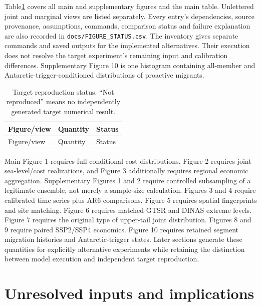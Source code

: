 \documentclass[11pt]{article}
\begin{document}
Table\ref{tab:status} covers all main and supplementary figures and the main
table. Unlettered joint and marginal views are listed separately. Every entry's
dependencies, source provenance, assumptions, commands, comparison status and
failure explanation are also recorded in \texttt{docs/FIGURE\_STATUS.csv}.
The inventory gives separate commands and saved outputs for the implemented
alternatives. Their execution does not resolve the target experiment's remaining
input and calibration differences. Supplementary Figure 10 is one histogram containing
all-member and Antarctic-trigger-conditioned distributions of proactive migrants.

\small
\begin{longtable}{p{}p{}p{}}
\caption{Target reproduction status. ``Not reproduced'' means no independently
generated target numerical result.}\label{tab:status}\\
\toprule Figure/view & Quantity & Status\\\midrule\endfirsthead
\toprule Figure/view & Quantity & Status\\\midrule\endhead

\bottomrule
\end{longtable}
\normalsize

Main Figure 1 requires full conditional cost distributions. Figure 2 requires
joint sea-level/cost realizations, and Figure 3 additionally requires regional
economic aggregation. Supplementary Figures 1 and 2 require controlled subsampling
of a legitimate ensemble, not merely a sample-size calculation. Figures 3 and 4
require calibrated time series plus AR6 comparisons. Figure 5 requires spatial
fingerprints and site matching. Figure 6 requires matched GTSR and DINAS extreme
levels. Figure 7 requires the original type of upper-tail joint distribution.
Figures 8 and 9 require paired SSP2/SSP4 economics. Figure 10 requires retained
segment migration histories and Antarctic-trigger states. Later sections
generate these quantities for explicitly alternative experiments while retaining
the distinction between model execution and independent target reproduction.









\section{Unresolved inputs and implications}
\end{document}
